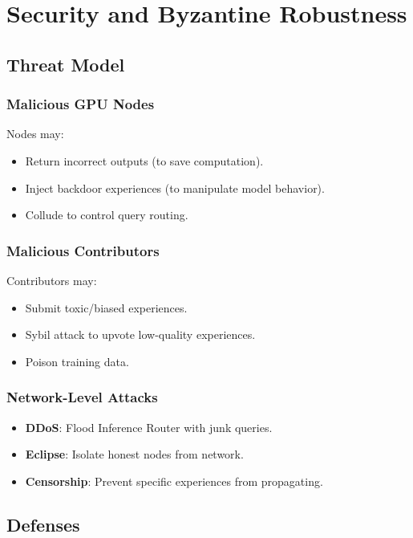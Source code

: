 \section{Security and Byzantine Robustness}


\subsection{Threat Model}

\subsubsection{Malicious GPU Nodes}

Nodes may:
\begin{itemize}
\item Return incorrect outputs (to save computation).
\item Inject backdoor experiences (to manipulate model behavior).
\item Collude to control query routing.
\end{itemize}

\subsubsection{Malicious Contributors}

Contributors may:
\begin{itemize}
\item Submit toxic/biased experiences.
\item Sybil attack to upvote low-quality experiences.
\item Poison training data.
\end{itemize}

\subsubsection{Network-Level Attacks}

\begin{itemize}
\item \textbf{DDoS}: Flood Inference Router with junk queries.
\item \textbf{Eclipse}: Isolate honest nodes from network.
\item \textbf{Censorship}: Prevent specific experiences from propagating.
\end{itemize}

\subsection{Defenses}

